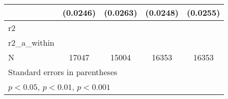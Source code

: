 {\begin{tabular}{l*{4}{c}}
            &    (0.0246)         &    (0.0263)         &    (0.0248)         &    (0.0255)         \\
\hline
r2          &                     &                     &                     &                     \\
r2\_a\_within &                     &                     &                     &                     \\
N           &       17047         &       15004         &       16353         &       16353         \\
\hline\hline
\multicolumn{5}{l}{\footnotesize Standard errors in parentheses}\\
\multicolumn{5}{l}{\footnotesize \sym{*} \(p<0.05\), \sym{**} \(p<0.01\), \sym{***} \(p<0.001\)}\\
\end{tabular}
}
